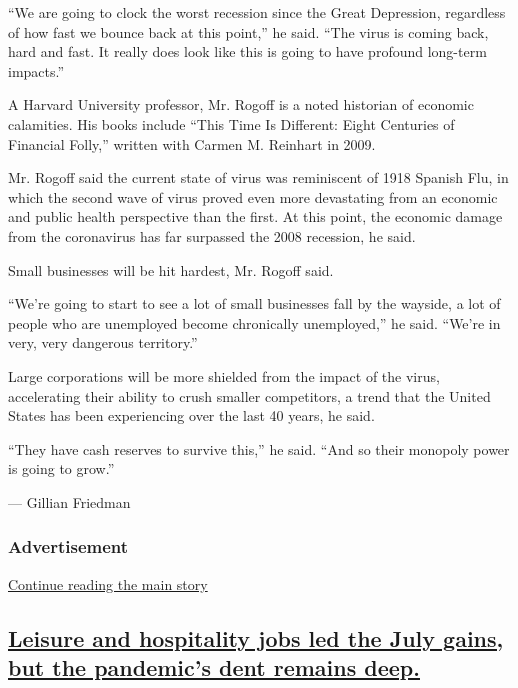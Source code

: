 ``We are going to clock the worst recession since the Great Depression,
regardless of how fast we bounce back at this point,'' he said. ``The
virus is coming back, hard and fast. It really does look like this is
going to have profound long-term impacts.''

A Harvard University professor, Mr. Rogoff is a noted historian of
economic calamities. His books include ``This Time Is Different: Eight
Centuries of Financial Folly,'' written with Carmen M. Reinhart in 2009.

Mr. Rogoff said the current state of virus was reminiscent of 1918
Spanish Flu, in which the second wave of virus proved even more
devastating from an economic and public health perspective than the
first. At this point, the economic damage from the coronavirus has far
surpassed the 2008 recession, he said.

Small businesses will be hit hardest, Mr. Rogoff said.

``We're going to start to see a lot of small businesses fall by the
wayside, a lot of people who are unemployed become chronically
unemployed,'' he said. ``We're in very, very dangerous territory.''

Large corporations will be more shielded from the impact of the virus,
accelerating their ability to crush smaller competitors, a trend that
the United States has been experiencing over the last 40 years, he said.

``They have cash reserves to survive this,'' he said. ``And so their
monopoly power is going to grow.''

--- Gillian Friedman

\hypertarget{advertisement-1}{%
\subsubsection{Advertisement}\label{advertisement-1}}

\protect\hyperlink{after-dfp-ad-mid2}{Continue reading the main story}

\hypertarget{leisure-and-hospitality-jobs-led-the-july-gains-but-the-pandemics-dent-remains-deep}{%
\subsection{\texorpdfstring{\protect\hyperlink{leisure-and-hospitality-jobs-led-the-july-gains-but-the-pandemics-dent-remains-deep}{Leisure
and hospitality jobs led the July gains, but the pandemic's dent remains
deep.}}{Leisure and hospitality jobs led the July gains, but the pandemic's dent remains deep.}}\label{leisure-and-hospitality-jobs-led-the-july-gains-but-the-pandemics-dent-remains-deep}}

